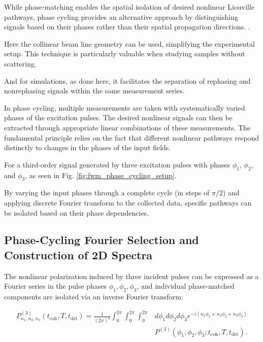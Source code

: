 \noindent 
While phase-matching enables the spatial isolation of desired nonlinear Liouville pathways, phase cycling provides an alternative approach by distinguishing signals based on their phases rather than their spatial propagation directions. %
\cite{mukamel1995principlesnonlinearoptical, cho2009twodimensionalopticalspectroscopy, jonas2003twodimensionalfemtosecondspectroscopy, brixneretal2004phasestabilizedtwodimensionalelectronic, greenetal2024vibrationalcoherenceshalfbroadband}.

\noindent 
Here the collinear beam line geometry can be used, simplifying the experimental setup.
This technique is particularly valuable when studying samples without scattering.

\noindent 
And for simulations, as done here, it facilitates the separation of rephasing and nonrephasing signals within the same measurement series.

\noindent 
In phase cycling, multiple measurements are taken with systematically varied phases of the excitation pulses. The desired nonlinear signals can then be extracted through appropriate linear combinations of these measurements. The fundamental principle relies on the fact that different nonlinear pathways respond distinctly to changes in the phases of the input fields.

\noindent 
For a third-order signal generated by three excitation pulses with phases $\phi_1$, $\phi_2$, and $\phi_3$, as seen in Fig. \ref{fig:fwm_phase_cycling_setup}.

\noindent 
By varying the input phases through a complete cycle (in steps of $\pi/2$) and applying discrete Fourier transform to the collected data, specific pathways can be isolated based on their phase dependencies.


\subsection{Phase-Cycling Fourier Selection and Construction of 2D Spectra}
\label{subsec:phase_cycling_fourier_selection}


\noindent 
The nonlinear polarization induced by three incident pulses can be expressed as a Fourier series in the pulse phases $\phi_1, \phi_2, \phi_3$, and individual phase-matched components are isolated via an inverse Fourier transform:

\begin{align}
	P^{(3)}_{n_1,n_2,n_3}(t_{\text{coh}},T,t_{\text{det}}) =
	\frac{1}{(2\pi)^3} \int_{0}^{2\pi}	\int_{0}^{2\pi} \int_{0}^{2\pi}  
	& d\phi_1 d\phi_2 d\phi_3
	e^{-i(n_1\phi_1+n_2\phi_2+n_3\phi_3)} \\
	& P^{(3)}(\phi_1,\phi_2,\phi_3;t_{\text{coh}},T,t_{\text{det}}).
	\label{eq:continuous_phase_cycling}
\end{align}

